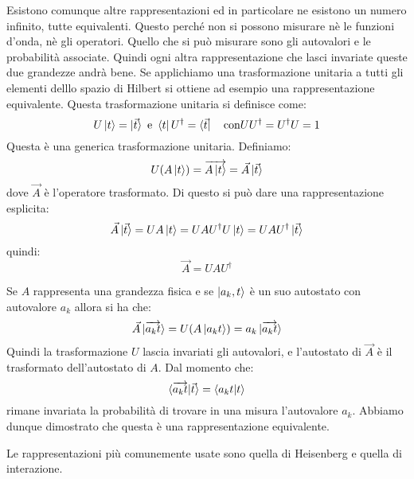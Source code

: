Esistono comunque altre rappresentazioni ed in particolare ne esistono un numero
infinito, tutte equivalenti. Questo perché non si possono misurare nè le
funzioni d'onda, nè gli operatori. Quello che si può misurare sono gli
autovalori e le probabilità associate.
Quindi ogni altra rappresentazione che lasci invariate queste due grandezze
andrà bene.
Se applichiamo una trasformazione unitaria a tutti gli elementi delllo spazio di
Hilbert si ottiene ad esempio una rappresentazione equivalente.
Questa trasformazione unitaria si definisce come:
\begin{equation}
  U\ket{t}=\ket{\vec{t}}  \text{ e } \bra{t}U^{\dag}=\bra{\vec{t}} \quad 
\text{con} UU^{\dag}=U^{\dagger}U=1
\end{equation}
Questa è una generica trasformazione unitaria. Definiamo:
\begin{equation}
U(A\ket{t})=\overrightarrow{A\ket{t}}=\vec{A}\ket{\vec{t}}
\end{equation}
dove $\vec{A}$ è l'operatore trasformato. Di questo si può dare una
rappresentazione esplicita:
\begin{equation}
\vec{A}\ket{\vec{t}}=UA\ket{t}=UAU^{\dag}U\ket{t}=UAU^{\dag}\ket{\vec{t}}
\end{equation}
quindi:
\begin{equation}
\vec{A}=UAU^{\dag}
\end{equation}

Se $A$ rappresenta una grandezza fisica e se $\ket{a_{k},t}$ è un suo autostato
con autovalore $a_{k}$ allora si ha che:
\begin{equation} 
\vec{A}\ket{\overrightarrow{a_{k}t}}=U(A\ket{a_{k}t})=a_{k}\ket{\overrightarrow{
a_{k}t}}
\end{equation}
Quindi la trasformazione $U$ lascia invariati gli autovalori, e l'autostato di
$\vec{A}$ è il trasformato dell'autostato di $A$. Dal momento che:
\begin{equation}
\braket{\overrightarrow{a_{k}t}|\vec{t}}=\braket{a_{k}t|t}
\end{equation}
rimane invariata la probabilità di trovare in una misura l'autovalore $a_{k}$.
Abbiamo dunque dimostrato che questa è una rappresentazione equivalente.

Le rappresentazioni più comunemente usate sono quella di Heisenberg e quella di
interazione.

